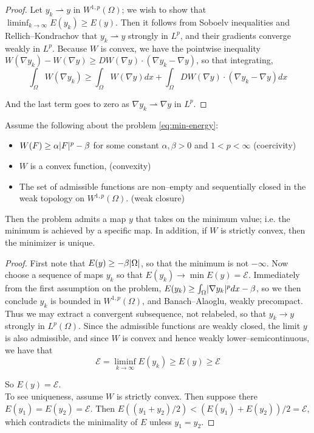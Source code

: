 \documentclass[../main.tex]{subfiles}
\begin{document}
\begin{proof}
	Let $y_k \rightharpoonup y$ in $W^{1,p}(\Omega)$; we wish to show that $\liminf_{k \to \infty} E(y_k) \geq E(y)$.
	Then it follows from Soboelv inequalities and Rellich--Kondrachov that $y_k \rightharpoonup y$ strongly in $L^p$, and their gradients converge weakly in $L^p$.
	Because $W$ is convex, we have the pointwise inequality $W(\nabla y_k) - W(\nabla y) \geq  DW(\nabla y) \cdot (\nabla y_{k} - \nabla y)$, so that integrating,
	\begin{equation*}
		\int_{\Omega} W(\nabla y_k) \geq \int_{\Omega} W(\nabla y) dx + \int_{\Omega} DW ( \nabla y) \cdot (\nabla y_k - \nabla y) dx
	\end{equation*}

	And the last term goes to zero as $\nabla y_{k} \rightharpoonup \nabla y$ in $L^p$.
\end{proof}

\begin{thm}
	Assume the following about the problem \eqref{eq:min-energy}:
	\begin{itemize}
		\item $W(F) \geq \alpha \lvert F\rvert^p - \beta$ for some constant $\alpha, \beta > 0$ and $1 < p < \infty$ (coercivity)
		\item $W$ is a convex function, (convexity)
		\item The set of admissible functions are non--empty and sequentially closed in the weak topology on $W^{1,p}(\Omega)$. (weak closure)
	\end{itemize}

	Then the problem admits a map $y$ that takes on the minimum value; i.e. the minimum is achieved by a specific map.
	In addition, if $W$ is strictly convex, then the minimizer is unique.
\end{thm}

\begin{proof}
	First note that $E(y) \geq - \beta \lvert\Omega\rvert$, so that the minimum is not $- \infty$.
	Now choose a sequence of maps $y_k$ so that $E(y_k) \to \min E(y) = \mathcal{E}$.
	Immediately from the first assumption on the problem, $E(y_k) \geq \int_{\Omega} \lvert\nabla y_k\rvert^{p} dx - \beta$, so we then conclude $y_k$ is bounded in $W^{1,p}(\Omega)$, and Banach--Alaoglu, weakly precompact.
	Thus we may extract a convergent subsequence, not relabeled, so that $y_k \to y$ strongly in $L^p(\Omega)$.
	Since the admissible functions are weakly closed, the limit $y$ is also admissible, and since $W$ is convex and hence weakly lower--semicontinuous, we have that
	\begin{equation*}
		\mathcal{E} = \liminf_{k \to \infty} E(y_k) \geq E(y) \geq \mathcal{E}
	\end{equation*}

	So $E(y) = \mathcal{E}$. \\

	To see uniqueness, assume $W$ is strictly convex.
	Then suppose there $E(y_1) = E(y_2) = \mathcal{E}$.
	Then $E((y_1+y_2)/2) < (E(y_1) + E(y_2))/2 = \mathcal{E}$, which contradicts the minimality of $E$ unless $y_1 = y_2$.
\end{proof}
\end{document}
